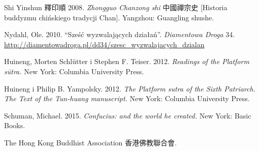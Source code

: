 Shi Yinshun 釋印順 2008. \textit{Zhongguo Chanzong shi} 中國禪宗史 [Historia buddyzmu chińskiego tradycji Chan]. Yangzhou: Guangling shushe.

Nydahl, Ole. 2010. ``Sześć wyzwalających działań''. \textit{Diamentowa Droga} 34. \url{http://diamentowadroga.pl/dd34/szesc_wyzwalajacych_dzialan}

Huineng, Morten Schlütter i Stephen F. Teiser. 2012. \textit{Readings of the Platform sūtra.} New York: Columbia University Press.%

Huineng i Philip B. Yampolsky. 2012. \textit{The Platform sutra of the Sixth Patriarch. The Text of the Tun-huang manuscript.} New York: Columbia University Press.%

Schuman, Michael. 2015. \textit{Confucius: and the world he created.} New York: Basic Books.

The Hong Kong Buddhist Association 香港佛教聯合會. 
